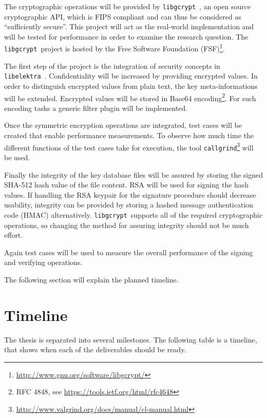 \documentclass[a4paper,12pt]{article}
\newcommand{\libelektra}{\texttt{libelektra}~}
\newcommand{\libgcrypt}{\texttt{libgcrypt}~}
\begin{document}
The cryptographic operations will be provided by \libgcrypt, an open source cryptographic API, which is FIPS compliant and can thus be considered as ``sufficiently secure''.
This project will act as the real-world implementation and will be tested for performance in order to examine the research question.
The \libgcrypt project is hosted by the Free Software Foundation (FSF)\footnote{\url{http://www.gnu.org/software/libgcrypt/}}.

The first step of the project is the integration of security concepts in \libelektra. 
Confidentiality will be increased by providing encrypted values. 
In order to distinguish encrypted values from plain text, the key meta-informations will be extended. 
Encrypted values will be stored in Base64 encoding\footnote{RFC 4848, see \url{https://tools.ietf.org/html/rfc4648}}.
For such encoding tasks a generic filter plugin will be implemented.

Once the symmetric encryption operations are integrated, test cases will be created that enable performance measurements.
To observe how much time the different functions of the test cases take for execution, the tool \texttt{callgrind}\footnote{\url{http://www.valgrind.org/docs/manual/cl-manual.html}} will be used.

Finally the integrity of the key database files will be assured by storing the signed SHA-512 hash value of the file content. 
RSA will be used for signing the hash values. 
If handling the RSA keypair for the signature procedure should decrease usability, integrity can be provided by storing a hashed message authentication code (HMAC) alternatively.
\libgcrypt supports all of the required cryptographic operations, so changing the method for assuring integrity should not be much effort.

Again test cases will be used to measure the overall performance of the signing and verifying operations.

The following section will explain the planned timeline.

\section{Timeline}

The thesis is separated into several milestones. The following table is a timeline, that shows when each of the deliverables should be ready.
\end{document}
